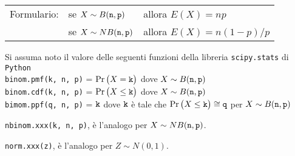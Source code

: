 \documentclass[11pt,twoside,a4paper]{article}
\begin{document}
\vfill\hrulefill\par
\begin{tabular}{@{}lll}
Formulario:& se $X\sim B({\tt n},{\tt p})$ & allora $E(X)=np$\\
           & se $X\sim NB({\tt n},{\tt p})$& allora $E(X)=n(1-p)/p$
\end{tabular}

Si assuma noto il valore delle seguenti funzioni della libreria {\tt scipy.stats\/} di  {\tt Python\/}\\
{\tt binom.pmf(k, n, p)} = $\Pr\big(X={\tt k}\big)$ dove $X\sim B({\tt n},{\tt p})$\\
{\tt binom.cdf(k, n, p)} = $\Pr\big(X\le{\tt k}\big)$ dove  $X\sim B({\tt n},{\tt p})$ \\
{\tt bimom.ppf(q, n, p)} = ${\tt k}$ dove ${\tt k}$ è tale che $\Pr\big(X\le{\tt k}\big)\cong{\tt q}$ per $X\sim B({\tt n},{\tt p})$ 

{\tt nbinom.xxx(k, n, p)}, è l'analogo per $X\sim NB({\tt n},{\tt p})$.

{\tt norm.xxx(z)}, è l'analogo per $Z\sim N(0,1)$.
\end{document}
